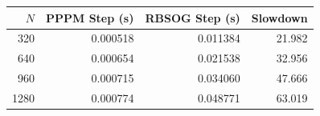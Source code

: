 \begin{tabular}{rrrr}
\toprule
$N$ & PPPM Step (s) & RBSOG Step (s) & Slowdown \\
\midrule
320 & 0.000518 & 0.011384 & 21.982 \\
640 & 0.000654 & 0.021538 & 32.956 \\
960 & 0.000715 & 0.034060 & 47.666 \\
1280 & 0.000774 & 0.048771 & 63.019 \\
\bottomrule
\end{tabular}
